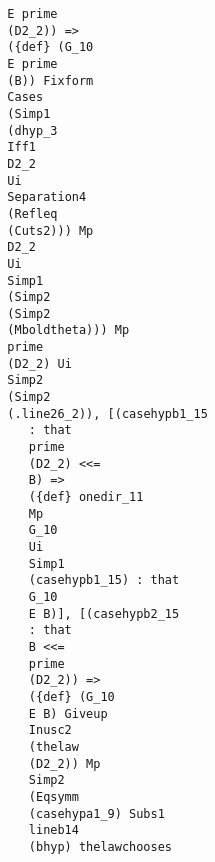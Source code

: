 \documentclass[12pt]{article}
\begin{document}
\begin{verbatim}
                                        E prime 
                                        (D2_2)) => 
                                        ({def} (G_10 
                                        E prime 
                                        (B)) Fixform 
                                        Cases 
                                        (Simp1 
                                        (dhyp_3 
                                        Iff1 
                                        D2_2 
                                        Ui 
                                        Separation4 
                                        (Refleq 
                                        (Cuts2))) Mp 
                                        D2_2 
                                        Ui 
                                        Simp1 
                                        (Simp2 
                                        (Simp2 
                                        (Mboldtheta))) Mp 
                                        prime 
                                        (D2_2) Ui 
                                        Simp2 
                                        (Simp2 
                                        (.line26_2)), [(casehypb1_15 
                                           : that 
                                           prime 
                                           (D2_2) <<= 
                                           B) => 
                                           ({def} onedir_11 
                                           Mp 
                                           G_10 
                                           Ui 
                                           Simp1 
                                           (casehypb1_15) : that 
                                           G_10 
                                           E B)], [(casehypb2_15 
                                           : that 
                                           B <<= 
                                           prime 
                                           (D2_2)) => 
                                           ({def} (G_10 
                                           E B) Giveup 
                                           Inusc2 
                                           (thelaw 
                                           (D2_2)) Mp 
                                           Simp2 
                                           (Eqsymm 
                                           (casehypa1_9) Subs1 
                                           lineb14 
                                           (bhyp) thelawchooses 

\end{verbatim}
\end{document}
